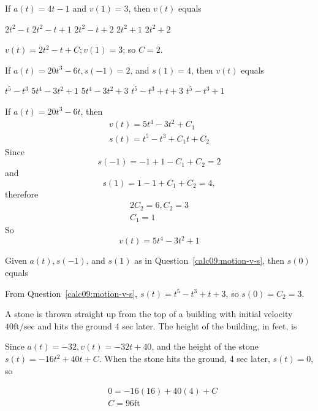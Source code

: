 
\question
If $a(t)=4 t-1$ and $v(1)=3$, then $v(t)$ equals
\begin{choices}
  \choice $2 t^{2}-t$
  \choice $2 t^{2}-t+1$
  \CorrectChoice $2 t^{2}-t+2$
  \choice $2 t^{2}+1$
  \choice $2 t^{2}+2$
\end{choices}
\begin{solution}
$v(t)=2 t^{2}-t+C ; v(1)=3$; so $C=2$.
\end{solution}

\question\label{calc09:motion-v-s}
If $a(t)=20 t^{3}-6 t, s(-1)=2$, and $s(1)=4$, then $v(t)$ equals
\begin{choices}
  \choice $t^{5}-t^{3}$
  \CorrectChoice $5 t^{4}-3 t^{2}+1$
  \choice $5 t^{4}-3 t^{2}+3$
  \choice $t^{5}-t^{3}+t+3$
  \choice $t^{5}-t^{3}+1$
\end{choices}
\begin{solution}
If $a(t)=20 t^{3}-6 t$, then
\[
\begin{gathered}
v(t)=5 t^{4}-3 t^{2}+C_{1} \\
s(t)=t^{5}-t^{3}+C_{1} t+C_{2}
\end{gathered}
\]
Since
\[
s(-1)=-1+1-C_{1}+C_{2}=2
\]
and
\[
s(1)=1-1+C_{1}+C_{2}=4,
\]
therefore
\[
\begin{gathered}
2 C_{2}=6, C_{2}=3 \\
C_{1}=1
\end{gathered}
\]
So
\[
v(t)=5 t^{4}-3 t^{2}+1
\]
\end{solution}


\newpage




\question
Given $a(t), s(-1)$, and $s(1)$ as in Question~\ref{calc09:motion-v-s}, then $s(0)$ equals
\begin{choices}
\end{choices}
\begin{solution}
From Question~\ref{calc09:motion-v-s}, $s(t)=t^{5}-t^{3}+t+3$, so $s(0)=C_{2}=3$.
\end{solution}

\question\label{calc09:stone-building}
A stone is thrown straight up from the top of a building with initial velocity $40 \mathrm{ft} / \mathrm{sec}$ and hits the ground 4 sec later. The height of the building, in feet, is
\begin{choices}
\end{choices}
\begin{solution}
Since $a(t)=-32, v(t)=-32 t+40$, and the height of the stone $s(t)=-16 t^{2}+40 t+C$. When the stone hits the ground, 4 sec later, $s(t)=0$, so


\[
\begin{aligned}
& 0=-16(16)+40(4)+C \\
& C=96 \mathrm{ft}
\end{aligned}
\]


\end{solution}

